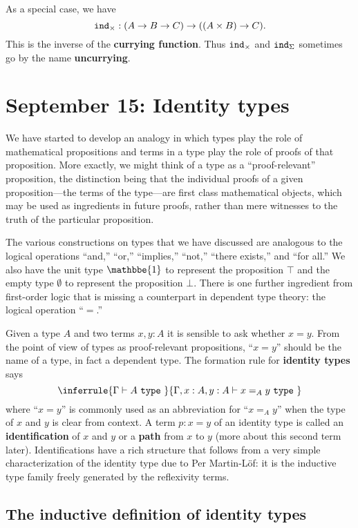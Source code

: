 \documentclass{amsart}
\theoremstyle{theorem}
\theoremstyle{definition}
\theoremstyle{remark}
\newcommand{\0}{\mathbbe{0}}
\newcommand{\1}{\mathbbe{1}}
\newcommand{\2}{\mathbbe{2}}
\newcommand{\3}{\mathbbe{3}}
\newcommand{\4}{\mathbbe{4}}
\newcommand{\univ}{{~\texttt{type}~}}
\newcommand{\term}[1]{{\textup{\texttt{#1}}}}
\newcommand{\ind}{\term{ind}}
\begin{document}
As a special case, we have
\[ \ind_\times : (A \to B \to C) \to ((A \times B) \to C).\]
This is the inverse of the \textbf{currying function}. Thus $\ind_\times$ and $\ind_\Sigma$ sometimes go by the name \textbf{uncurrying}.

\section*{September 15: Identity types}

We have started to develop an analogy in which types play the role of mathematical propositions and terms in a type play the role of proofs of that proposition. More exactly, we might think of a type as a ``proof-relevant'' proposition, the distinction being that the individual proofs of a given proposition---the terms of the type---are first class mathematical objects, which may be used as ingredients in future proofs, rather than mere witnesses to the truth of the particular proposition.

The various constructions on types that we have discussed are analogous to the logical operations ``and,'' ``or,'' ``implies,'' ``not,'' ``there exists,'' and ``for all.'' We also have the unit type $\1$ to represent the proposition $\top$ and the empty type $\emptyset$ to represent the proposition $\bot$. There is one further ingredient from first-order logic that is missing a counterpart in dependent type theory: the logical operation ``$=$.''

Given a type $A$ and two terms $x,y : A$ it is sensible to ask whether $x = y$. From the point of view of types as proof-relevant propositions, ``$x=y$'' should be the name of a type, in fact a dependent type. The formation rule for \textbf{identity types} says
\[
\inferrule{ \Gamma \vdash A \univ}
{\Gamma, x : A, y : A \vdash x =_A y \univ}
\]
where ``$x=y$'' is commonly used as an abbreviation for ``$x=_Ay$'' when the type of $x$ and $y$ is clear from context. A term $p : x = y$ of an identity type is called an \textbf{identification} of $x$ and $y$ or a \textbf{path} from $x$ to $y$ (more about this second term later). Identifications have a rich structure that follows from a very simple characterization of the identity type due to Per Martin-L\"{o}f: it is the inductive type family freely generated by the reflexivity terms.

\subsection*{The inductive definition of identity types}
\end{document}
